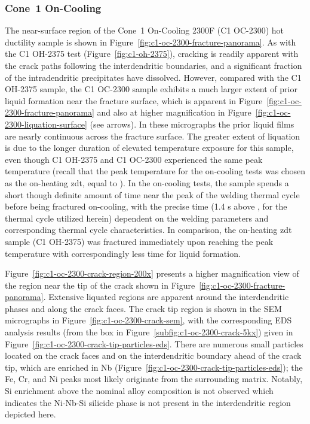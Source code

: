 {\subsubsection{Cone~1 On-Cooling}
The near-surface region of the Cone~1 On-Cooling 2300F (C1 OC-2300) hot ductility sample is shown in Figure~\ref{fig:c1-oc-2300-fracture-panorama}. As with the C1 OH-2375 test (Figure~\ref{fig:c1-oh-2375}), cracking is readily apparent with the crack paths following the interdendritic boundaries, and a significant fraction of the intradendritic precipitates have dissolved. However, compared with the C1 OH-2375 sample, the C1 OC-2300 sample exhibits a much larger extent of prior liquid formation near the fracture surface, which is apparent in Figure~\ref{fig:c1-oc-2300-fracture-panorama} and also at higher magnification in Figure~\ref{fig:c1-oc-2300-liquation-surface} (see arrows). In these micrographs the prior liquid films are nearly continuous across the fracture surface. The greater extent of liquation is due to the longer duration of elevated temperature exposure for this sample, even though C1 OH-2375 and C1 OC-2300 experienced the same peak temperature (recall that the peak temperature for the on-cooling tests was chosen as the on-heating \gls{zdt}, equal to ). In the on-cooling tests, the sample spends a short though definite amount of time near the peak of the welding thermal cycle before being fractured on-cooling, with the precise time (1.4 s above , for the thermal cycle utilized herein) dependent on the welding parameters and corresponding thermal cycle characteristics. In comparison, the on-heating \gls{zdt} sample (C1 OH-2375) was fractured immediately upon reaching the peak temperature with correspondingly less time for liquid formation.

Figure~\ref{fig:c1-oc-2300-crack-region-200x} presents a higher magnification view of the region near the tip of the crack shown in Figure~\ref{fig:c1-oc-2300-fracture-panorama}. Extensive liquated regions are apparent around the interdendritic phases and along the crack faces. The crack tip region is shown in the SEM micrographs in Figure~\ref{fig:c1-oc-2300-crack-sem}, with the corresponding EDS analysis results (from the box in Figure~\ref{subfig:c1-oc-2300-crack-5kx}) given in Figure~\ref{fig:c1-oc-2300-crack-tip-particles-eds}. There are numerous small particles located on the crack faces and on the interdendritic boundary ahead of the crack tip, which are enriched in Nb (Figure~\ref{fig:c1-oc-2300-crack-tip-particles-eds}); the Fe, Cr, and Ni peaks most likely originate from the surrounding matrix. Notably, Si enrichment above the nominal alloy composition is not observed which indicates the Ni-Nb-Si silicide phase is not present in the interdendritic region depicted here. 

}
